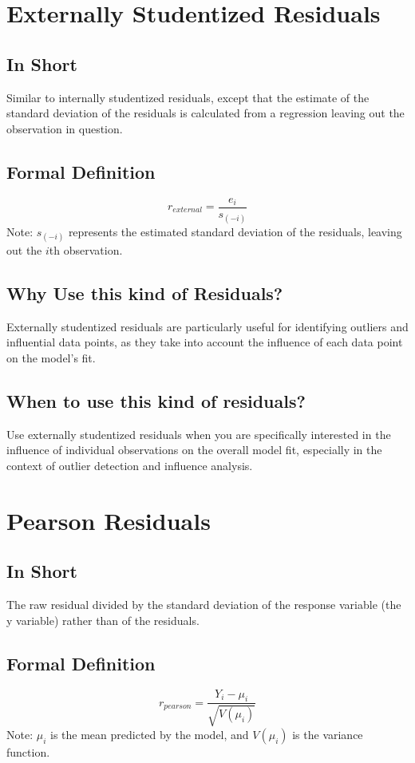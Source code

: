 \documentclass{article}
\begin{document}
\section{Externally Studentized Residuals}
\subsection{In Short}
Similar to internally studentized residuals, except that the estimate of the standard deviation of the residuals is calculated from a regression leaving out the observation in question.

\subsection{Formal Definition}
\[ r_{external} = \frac{e_i}{s_{(-i)}} \]
Note: \(s_{(-i)}\) represents the estimated standard deviation of the residuals, leaving out the \(i\)th observation.

\subsection{Why Use this kind of Residuals?}
Externally studentized residuals are particularly useful for identifying outliers and influential data points, as they take into account the influence of each data point on the model's fit.

\subsection{When to use this kind of residuals?}
Use externally studentized residuals when you are specifically interested in the influence of individual observations on the overall model fit, especially in the context of outlier detection and influence analysis.

\section{Pearson Residuals}
\subsection{In Short}
The raw residual divided by the standard deviation of the response variable (the y variable) rather than of the residuals.

\subsection{Formal Definition}
\[ r_{pearson} = \frac{Y_i - \mu_i}{\sqrt{V(\mu_i)}} \]
Note: \(\mu_i\) is the mean predicted by the model, and \(V(\mu_i)\) is the variance function.
\end{document}
